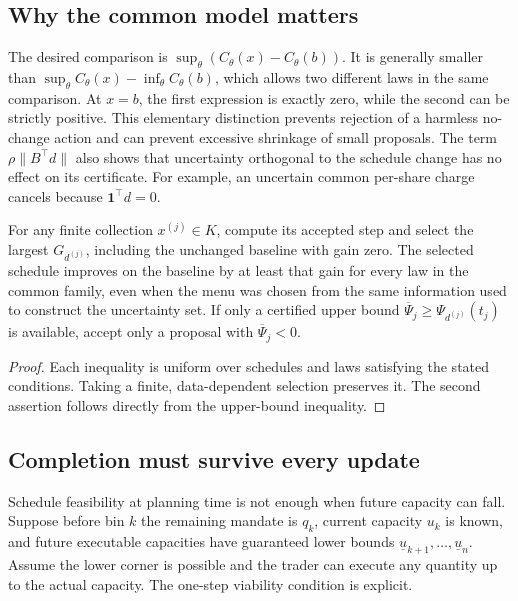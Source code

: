 \subsection{Why the common model matters}

The desired comparison is $\sup_\theta(C_\theta(x)-C_\theta(b))$.
It is generally smaller than
$\sup_\theta C_\theta(x)-\inf_\theta C_\theta(b)$, which allows two
different laws in the same comparison. At $x=b$, the first expression is
exactly zero, while the second can be strictly positive. This elementary
distinction prevents rejection of a harmless no-change action and can
prevent excessive shrinkage of small proposals. The term
$\rho\|B^\top d\|$ also shows that uncertainty orthogonal to the schedule
change has no effect on its certificate. For example, an uncertain common
per-share charge cancels because $\mathbf1^\top d=0$.

\begin{corollary}
For any finite collection $x^{(j)}\in K$, compute its accepted step and
select the largest $G_{d^{(j)}}$, including the unchanged baseline with
gain zero. The selected schedule improves on the baseline by at least that
gain for every law in the common family, even when the menu was chosen from
the same information used to construct the uncertainty set. If only a
certified upper bound $\overline\Psi_j\ge\Psi_{d^{(j)}}(t_j)$ is available,
accept only a proposal with $\overline\Psi_j<0$.
\end{corollary}
\begin{proof}
Each inequality is uniform over schedules and laws satisfying the stated
conditions. Taking a finite, data-dependent selection preserves it. The
second assertion follows directly from the upper-bound inequality.
\end{proof}

\subsection{Completion must survive every update}

Schedule feasibility at planning time is not enough when future capacity
can fall. Suppose before bin $k$ the remaining mandate is $q_k$, current
capacity $u_k$ is known, and future executable capacities have guaranteed
lower bounds $\underline u_{k+1},\ldots,\underline u_n$. Assume the lower
corner is possible and the trader can execute any quantity up to the actual
capacity. The one-step viability condition is explicit.

